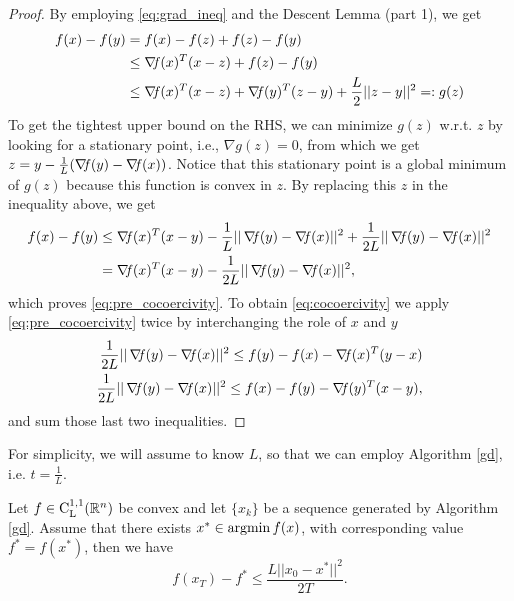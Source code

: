 \documentclass[10pt,a4paper]{article}
\begin{document}
\begin{proof}
	By employing \eqref{eq:grad_ineq} and the Descent Lemma (part 1), we get
	\begin{equation*}
		\begin{split}
			f(x) - f(y) &= f(x) - f(z) + f(z) - f(y)\\
			& \leq \operatorname*{\mathit{\nabla \!f}}(x)^T(x-z) + f(z) - f(y)\\
			&\leq \operatorname*{\mathit{\nabla \!f}}(x)^T(x-z) + \operatorname*{\mathit{\nabla \!f}}(y)^T(z-y) + \frac{L}{2}||z-y||^2=:g(z)
		\end{split}
	\end{equation*}
To get the tightest upper bound on the RHS, we can minimize $g(z)$ w.r.t. $z$ by looking for a stationary point, i.e., $\nabla g(z)=0$, from which we get $z=y - \frac{1}{L}(\operatorname*{\mathit{\nabla \!f}}(y)-\operatorname*{\mathit{\nabla \!f}}(x))$. Notice that this stationary point is a global minimum of $g(z)$ because this function is convex in $z$. By replacing this $z$ in the inequality above, we get 
\begin{equation*}
	\begin{split}
		f(x) - f(y) &\leq \grad(x)^T(x-y) -\frac{1}{L}||\grad(y)-\grad(x)||^2 + \frac{1}{2L}||\grad(y)-\grad(x)||^2\\
		&= \grad(x)^T(x-y)-\frac{1}{2L}||\grad(y)-\grad(x)||^2,
	\end{split}
\end{equation*}
which proves \eqref{eq:pre_cocoercivity}. To obtain \eqref{eq:cocoercivity} we apply \eqref{eq:pre_cocoercivity} twice by interchanging the role of $x$ and $y$
\begin{align*}
	\frac{1}{2L} ||\operatorname*{\mathit{\nabla \!f}}(y)-\operatorname*{\mathit{\nabla \!f}}(x)||^2 \leq f(y)-f(x) -\operatorname*{\mathit{\nabla \!f}}(x)^T(y-x)\\
	\frac{1}{2L} ||\operatorname*{\mathit{\nabla \!f}}(y)-\operatorname*{\mathit{\nabla \!f}}(x)||^2 \leq f(x)-f(y) -\operatorname*{\mathit{\nabla \!f}}(y)^T(x-y),
\end{align*}
and sum those last two inequalities.
\end{proof}
\noindent For simplicity, we will assume to know $L$, so that we can employ Algorithm \eqref{gd}, i.e. $t=\frac{1}{L}$.
\begin{theorem}
	Let $f\in \mathord{\mathrm{C^{1,1}_{L}}}(\mathbb{R}^n)$ be convex and let $\{x_k\}$ be a sequence generated by Algorithm \ref{gd}. Assume that there exists $x^*\in \operatorname*{argmin} f(x)$, with corresponding value $f^*=f(x^*)$, then we have 
	\begin{equation}\label{eq:convex_convergence}
		f(x_T)-f^* \leq \frac{L ||x_0-x^*||^2}{2T}.
	\end{equation}
\end{theorem}
\end{document}
